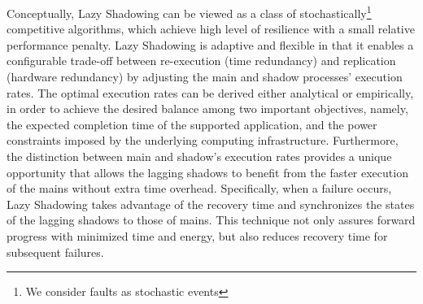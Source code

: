 Conceptually, Lazy Shadowing can be viewed as a class of stochastically\footnote{We consider faults as stochastic events} competitive algorithms, which 
achieve high level of resilience with a small relative performance penalty.
Lazy Shadowing is adaptive and flexible in that it enables a configurable trade-off between re-execution (time redundancy) and replication (hardware redundancy) by adjusting the main and shadow processes' execution rates.
The optimal execution rates can be derived either analytical or empirically, in order to achieve the desired balance among two important objectives, namely, the expected completion time of the supported application, and the power constraints imposed by the underlying computing infrastructure. %
Furthermore, the distinction between main and shadow's execution rates provides a unique opportunity %
that allows the lagging shadows to benefit from the faster execution of the mains without extra time overhead.
Specifically, when a failure occurs, Lazy Shadowing takes advantage of the recovery time and synchronizes the states of the lagging shadows to those of mains. This technique not only assures forward progress with minimized time and energy, but also reduces recovery time for subsequent failures.  


